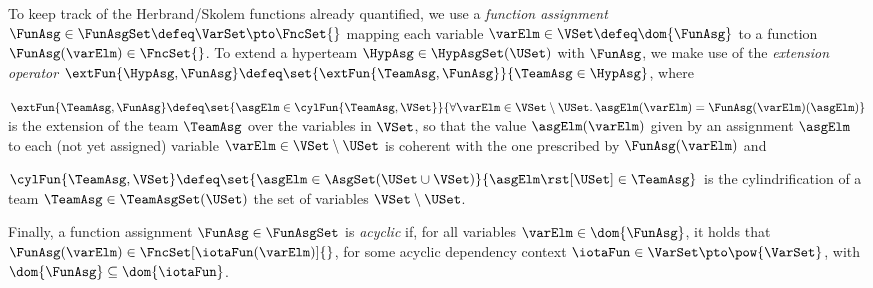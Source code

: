 \documentclass[authoryear]{elsarticle}
\begin{document}
To keep track of the Herbrand/Skolem functions already quantified, we use a
\emph{function assignment} $\FunAsg \in \FunAsgSet \defeq \VarSet \pto
\FncSet{}$ mapping each variable $\varElm \in \VSet \defeq \dom{\FunAsg}$ to a
function $\FunAsg(\varElm) \in \FncSet{}$.
To extend a hyperteam $\HypAsg \in \HypAsgSet(\USet)$ with $\FunAsg$, we make
use of the \emph{extension operator} $\extFun{\HypAsg, \FunAsg} \defeq \set{
\extFun{\TeamAsg, \FunAsg} }{ \TeamAsg \in \HypAsg }$, where
\begin{inparaenum}[(i)]
\item
  $\extFun{\TeamAsg, \FunAsg} \defeq \set{ \asgElm \in \cylFun{\TeamAsg, \VSet}
  }{ \forall \varElm \in \VSet \setminus \USet \ldotp \asgElm(\varElm) =
    \FunAsg(\varElm)(\asgElm) }$ is the extension of the team $\TeamAsg$ over
  the variables in $\VSet$, so that the value $\asgElm(\varElm)$ given by an
  assignment $\asgElm$ to each (not yet assigned) variable $\varElm \in \VSet
  \setminus \USet$ is coherent with the one prescribed by $\FunAsg(\varElm)$ and
\item
  $\cylFun{\TeamAsg, \VSet} \defeq \set{ \asgElm \in \AsgSet(\USet \cup \VSet)
  }{ \asgElm \rst[\USet] \in \TeamAsg }$ is the cylindrification of a team
  $\TeamAsg \in \TeamAsgSet(\USet)$ \wrt the set of variables $\VSet \setminus
  \USet$.
\end{inparaenum}
Finally, a function assignment $\FunAsg \in \FunAsgSet$ is \emph{acyclic} if,
for all variables $\varElm \in \dom{\FunAsg}$, it holds that $\FunAsg(\varElm)
\in \FncSet[\iotaFun(\varElm)]{}$, for some acyclic dependency context $\iotaFun
\in \VarSet \pto \pow{\VarSet}$, with $\dom{\FunAsg} \subseteq \dom{\iotaFun}$.
\end{document}
